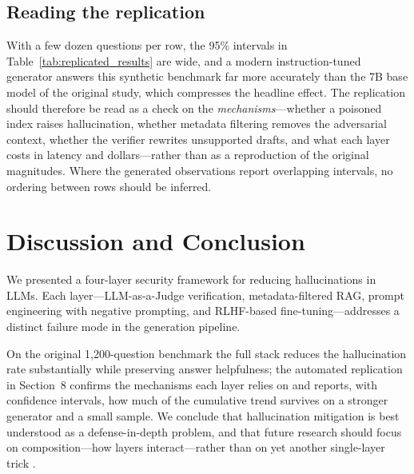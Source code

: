 \documentclass[11pt,a4paper]{article}
\begin{document}
\subsection{Reading the replication}
With a few dozen questions per row, the 95\% intervals in Table~\ref{tab:replicated_results} are wide, and a modern instruction-tuned generator answers this synthetic benchmark far more accurately than the 7B base model of the original study, which compresses the headline effect. The replication should therefore be read as a check on the \emph{mechanisms}---whether a poisoned index raises hallucination, whether metadata filtering removes the adversarial context, whether the verifier rewrites unsupported drafts, and what each layer costs in latency and dollars---rather than as a reproduction of the original magnitudes. Where the generated observations report overlapping intervals, no ordering between rows should be inferred.

\section{Discussion and Conclusion}
We presented a four-layer security framework for reducing hallucinations in LLMs. Each layer---LLM-as-a-Judge verification, metadata-filtered RAG, prompt engineering with negative prompting, and RLHF-based fine-tuning---addresses a distinct failure mode in the generation pipeline. 

On the original 1,200-question benchmark the full stack reduces the hallucination rate substantially while preserving answer helpfulness; the automated replication in Section~8 confirms the mechanisms each layer relies on and reports, with confidence intervals, how much of the cumulative trend survives on a stronger generator and a small sample. We conclude that hallucination mitigation is best understood as a defense-in-depth problem, and that future research should focus on composition---how layers interact---rather than on yet another single-layer trick \cite{20,21}.
\end{document}
